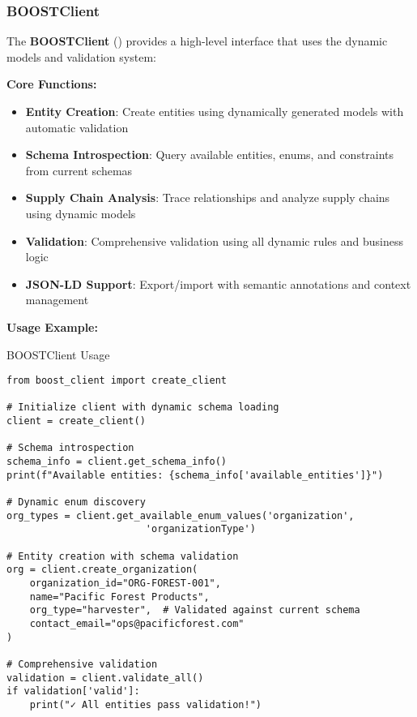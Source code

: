 \subsubsection{BOOSTClient}
\label{sec:python-client}

The \textbf{BOOSTClient} () provides a high-level interface that uses the dynamic models and validation system:

\textbf{Core Functions:}
\begin{itemize}
    \item \textbf{Entity Creation}: Create entities using dynamically generated models with automatic validation
    \item \textbf{Schema Introspection}: Query available entities, enums, and constraints from current schemas
    \item \textbf{Supply Chain Analysis}: Trace relationships and analyze supply chains using dynamic models
    \item \textbf{Validation}: Comprehensive validation using all dynamic rules and business logic
    \item \textbf{JSON-LD Support}: Export/import with semantic annotations and context management
\end{itemize}

\textbf{Usage Example:}

\begin{pythonexample}{BOOSTClient Usage}
\begin{verbatim}
from boost_client import create_client

# Initialize client with dynamic schema loading
client = create_client()

# Schema introspection
schema_info = client.get_schema_info()
print(f"Available entities: {schema_info['available_entities']}")

# Dynamic enum discovery
org_types = client.get_available_enum_values('organization', 
                        'organizationType')

# Entity creation with schema validation
org = client.create_organization(
    organization_id="ORG-FOREST-001",
    name="Pacific Forest Products",
    org_type="harvester",  # Validated against current schema
    contact_email="ops@pacificforest.com"
)

# Comprehensive validation
validation = client.validate_all()
if validation['valid']:
    print("✓ All entities pass validation!")
\end{verbatim}
\end{pythonexample}

